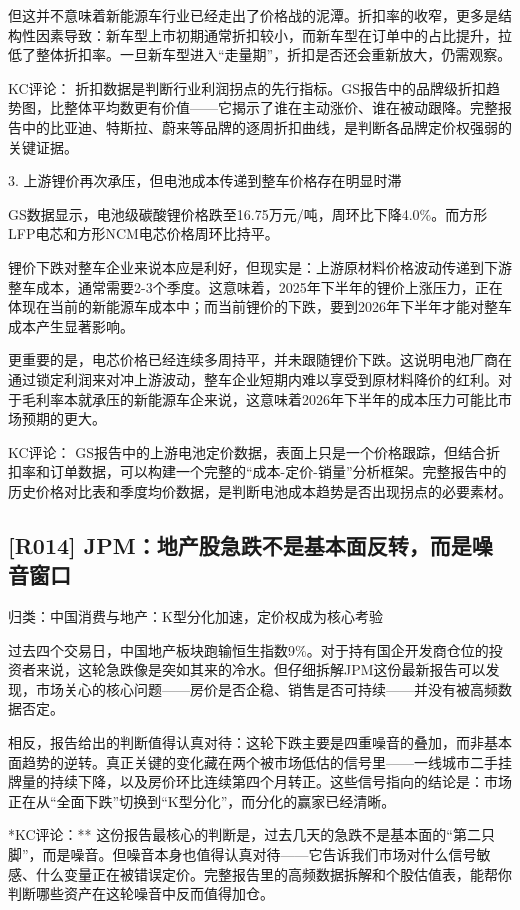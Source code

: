 \documentclass[11pt]{ctexart}
\begin{document}
但这并不意味着新能源车行业已经走出了价格战的泥潭。折扣率的收窄，更多是结构性因素导致：新车型上市初期通常折扣较小，而新车型在订单中的占比提升，拉低了整体折扣率。一旦新车型进入“走量期”，折扣是否还会重新放大，仍需观察。

KC评论： 折扣数据是判断行业利润拐点的先行指标。GS报告中的品牌级折扣趋势图，比整体平均数更有价值——它揭示了谁在主动涨价、谁在被动跟降。完整报告中的比亚迪、特斯拉、蔚来等品牌的逐周折扣曲线，是判断各品牌定价权强弱的关键证据。

3. 上游锂价再次承压，但电池成本传递到整车价格存在明显时滞

GS数据显示，电池级碳酸锂价格跌至16.75万元/吨，周环比下降4.0\%。而方形LFP电芯和方形NCM电芯价格周环比持平。

锂价下跌对整车企业来说本应是利好，但现实是：上游原材料价格波动传递到下游整车成本，通常需要2-3个季度。这意味着，2025年下半年的锂价上涨压力，正在体现在当前的新能源车成本中；而当前锂价的下跌，要到2026年下半年才能对整车成本产生显著影响。

更重要的是，电芯价格已经连续多周持平，并未跟随锂价下跌。这说明电池厂商在通过锁定利润来对冲上游波动，整车企业短期内难以享受到原材料降价的红利。对于毛利率本就承压的新能源车企来说，这意味着2026年下半年的成本压力可能比市场预期的更大。

KC评论： GS报告中的上游电池定价数据，表面上只是一个价格跟踪，但结合折扣率和订单数据，可以构建一个完整的“成本-定价-销量”分析框架。完整报告中的历史价格对比表和季度均价数据，是判断电池成本趋势是否出现拐点的必要素材。

\subsection{[R014] JPM：地产股急跌不是基本面反转，而是噪音窗口}
{\small\color{refgray}归类：中国消费与地产：K型分化加速，定价权成为核心考验}

过去四个交易日，中国地产板块跑输恒生指数9\%。对于持有国企开发商仓位的投资者来说，这轮急跌像是突如其来的冷水。但仔细拆解JPM这份最新报告可以发现，市场关心的核心问题——房价是否企稳、销售是否可持续——并没有被高频数据否定。

相反，报告给出的判断值得认真对待：这轮下跌主要是四重噪音的叠加，而非基本面趋势的逆转。真正关键的变化藏在两个被市场低估的信号里——一线城市二手挂牌量的持续下降，以及房价环比连续第四个月转正。这些信号指向的结论是：市场正在从“全面下跌”切换到“K型分化”，而分化的赢家已经清晰。

*KC评论：** 这份报告最核心的判断是，过去几天的急跌不是基本面的“第二只脚”，而是噪音。但噪音本身也值得认真对待——它告诉我们市场对什么信号敏感、什么变量正在被错误定价。完整报告里的高频数据拆解和个股估值表，能帮你判断哪些资产在这轮噪音中反而值得加仓。
\end{document}
